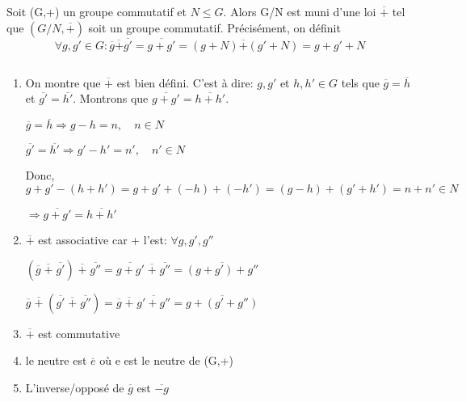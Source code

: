 \begin{thrm}
Soit (G,+) un groupe commutatif et $N \leq G$. Alors G/N est muni d'une loi $\overline{+}$ tel que $(G/N,\overline{+})$ soit un groupe commutatif. Précisément, on définit \[ \forall g,{g}' \in G: \overline{g} \overline{+} \overline{{g}'} = \overline{g+{g}'} = (g+N) \overline{+} ({g}' + N) = g + {g}' + N \]
\end{thrm}

\begin{demo} $\;$
\begin{enumerate}[$\cdot$]
	\item On montre que $\overline{+}$ est bien défini. C'est à dire: $g, {g}'$ et $h, {h}' \in G$ tels que $\overline{g} = \overline{h}$ et $\overline{{g}'} = \overline{{h}'}$. Montrons que $\overline{g+{g}'} = \overline{h+{h}'}$.

	\hspace{1cm} $ \overline{g} = \overline{h} \Rightarrow g-h=n, \quad n\in N $

	\hspace{1cm} $ \overline{{g}'} = \overline{{h}'} \Rightarrow {g}' - {h}' = {n}' , \quad {n}' \in N$

	\hspace{1cm} Donc, $g+{g}' - (h+{h}') = g + {g}' + (-h) + (-{h}') = (g-h) + ({g}' + {h}') = n + {n}' \in N$

	\hspace{1cm} $\Rightarrow \overline{g+{g}'} = \overline{h+{h}'}$
	\item $\overline{+}$ est associative car + l'est: $\forall g,{g}',{g}''$

	\hspace{1cm} $(\overline{g}\;\overline{+}\;\overline{{g}'})\;\overline{+}\;\overline{{g}''} = \overline{g + {g}'}\;\overline{+}\;\overline{{g}''} = \overline{(g+{g}')+{g}''}$

	\hspace{1cm} $\overline{g}\;\overline{+}\;(\overline{{g}'}\;\overline{+}\;\overline{{g}''}) = \overline{g}\;\overline{+}\;\overline{{g}' + {g}''} = \overline{g+({g}' + {g}'')}$

	\item $\overline{+}$ est commutative

	\item le neutre est $\overline{e}$ où e est le neutre de (G,+)

	\item L'inverse/opposé de $\overline{g}$ est $\overline{-g}$
\end{enumerate}
\end{demo}

